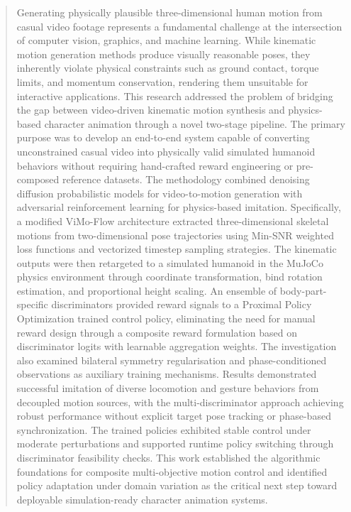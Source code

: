 \documentclass[MTech]{iittpdiss}
\begin{document}
\begin{abstract}
Generating physically plausible three-dimensional human motion from casual video footage represents a fundamental challenge at the intersection of computer vision, graphics, and machine learning. While kinematic motion generation methods produce visually reasonable poses, they inherently violate physical constraints such as ground contact, torque limits, and momentum conservation, rendering them unsuitable for interactive applications. This research addressed the problem of bridging the gap between video-driven kinematic motion synthesis and physics-based character animation through a novel two-stage pipeline. The primary purpose was to develop an end-to-end system capable of converting unconstrained casual video into physically valid simulated humanoid behaviors without requiring hand-crafted reward engineering or pre-composed reference datasets. The methodology combined denoising diffusion probabilistic models for video-to-motion generation with adversarial reinforcement learning for physics-based imitation. Specifically, a modified ViMo-Flow architecture extracted three-dimensional skeletal motions from two-dimensional pose trajectories using Min-SNR weighted loss functions and vectorized timestep sampling strategies. The kinematic outputs were then retargeted to a simulated humanoid in the MuJoCo physics environment through coordinate transformation, bind rotation estimation, and proportional height scaling. An ensemble of body-part-specific discriminators provided reward signals to a Proximal Policy Optimization trained control policy, eliminating the need for manual reward design through a composite reward formulation based on discriminator logits with learnable aggregation weights. The investigation also examined bilateral symmetry regularisation and phase-conditioned observations as auxiliary training mechanisms. Results demonstrated successful imitation of diverse locomotion and gesture behaviors from decoupled motion sources, with the multi-discriminator approach achieving robust performance without explicit target pose tracking or phase-based synchronization. The trained policies exhibited stable control under moderate perturbations and supported runtime policy switching through discriminator feasibility checks. This work established the algorithmic foundations for composite multi-objective motion control and identified policy adaptation under domain variation as the critical next step toward deployable simulation-ready character animation systems.
\end{abstract}
\end{document}
